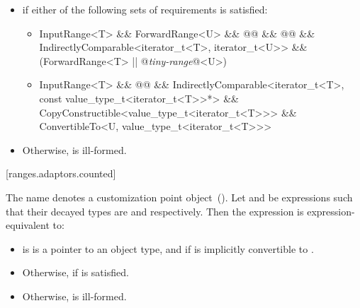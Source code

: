 \begin{itemize}
\item {} if either of the following sets of requirements
is satisfied:
\begin{itemize}
\item \begin{codeblock}
InputRange<T> && ForwardRange<U> &&
@@ &&
@@ &&
IndirectlyComparable<iterator_t<T>, iterator_t<U>> &&
(ForwardRange<T> || @\textit{tiny-range}@<U>)
\end{codeblock}

\item \begin{codeblock}
InputRange<T> && @@ &&
IndirectlyComparable<iterator_t<T>, const value_type_t<iterator_t<T>>*> &&
CopyConstructible<value_type_t<iterator_t<T>>> &&
ConvertibleTo<U, value_type_t<iterator_t<T>>>
\end{codeblock}
\end{itemize}
\item Otherwise,  is ill-formed.
\end{itemize}

[ranges.adaptors.counted]{}

\pnum
The name  denotes a customization point object~().
Let  and  be expressions such that their decayed types are 
and  respectively. Then the expression  is
expression-equivalent to:

\begin{itemize}
\item {} is  is a pointer to an object type,
and if  is implicitly convertible to .
\item Otherwise, 
if  is satisfied.
\item Otherwise,  is ill-formed.
\end{itemize}

